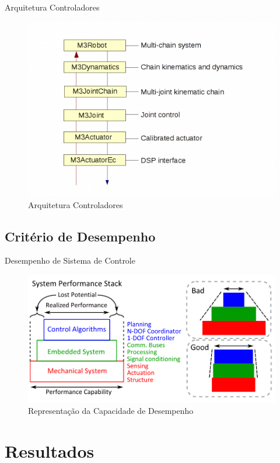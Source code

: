 \documentclass{beamer}
\begin{document}
\begin{frame}{Arquitetura Controladores}
\begin{figure}
    \centering
    \includegraphics[width = 0.8\linewidth]{tex/figs/controlarch.png}
    \caption{Arquitetura Controladores}
    \label{fig:m3arch}
\end{figure}
\end{frame}

\subsection{Critério de Desempenho}

\begin{frame}{Desempenho de Sistema de Controle}
\begin{figure}
    \centering
    \includegraphics[width = 0.9\linewidth]{tex/figs/system_perfomance.png}
    \caption{Representação da Capacidade de Desempenho}
    \label{fig:system_perfomance}
\end{figure}
\end{frame}

\section{Resultados}
\end{document}
